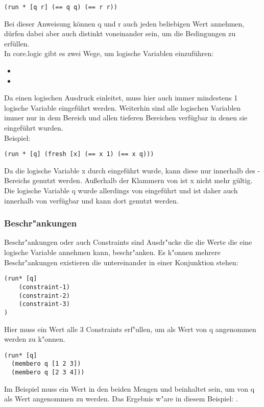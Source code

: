 \begin{lstlisting}
(run * [q r] (== q q) (== r r))
\end{lstlisting}
\begin{flushleft}
\end{flushleft}
Bei dieser Anweisung können q und r auch jeden beliebigen Wert annehmen, dürfen dabei aber auch distinkt voneinander sein, um die Bedingungen zu erfüllen.\\


In core.logic gibt es zwei Wege, um logische Variablen einzuführen:
\begin{itemize}
\item {}
\item {}
\end{itemize}

Da  einen logischen Ausdruck einleitet, muss hier auch immer mindestens 1 logische Variable eingeführt werden. Weiterhin sind alle logischen Variablen immer nur in dem Bereich und allen tieferen Bereichen verfügbar in denen sie eingeführt wurden.\\
Beispiel:
\begin{lstlisting}
(run * [q] (fresh [x] (== x 1) (== x q)))
\end{lstlisting}
Da die logische Variable x durch  eingeführt wurde, kann diese nur innerhalb des -Bereichs genutzt werden. Außerhalb der Klammern von  ist x nicht mehr gültig. Die logische Variable q wurde allerdings von   eingeführt und ist daher auch innerhalb von  verfügbar und kann dort genutzt werden.


\subsubsection{Beschr"ankungen}

Beschr"ankungen oder auch Constraints sind Ausdr"ucke die die Werte die eine logische Variable annehmen kann, beschr"anken. Es k"onnen mehrere Beschr"ankungen existieren die untereinander in einer Konjunktion stehen:
\begin{lstlisting}
(run* [q]
    (constraint-1)
    (constraint-2)
    (constraint-3)
)
\end{lstlisting}

Hier muss ein Wert alle 3 Constraints erf"ullen, um als Wert von q angenommen werden zu k"onnen.
\begin{lstlisting}
(run* [q]
  (membero q [1 2 3])
  (membero q [2 3 4]))
\end{lstlisting}

Im Beispiel muss ein Wert in den beiden Mengen \code{[1 2 3]} und \code{[2 3 4]} beinhaltet sein, um von q als Wert angenommen zu werden. Das Ergebnis w"are in diesem Beispiel: \code{[2 3]}.


